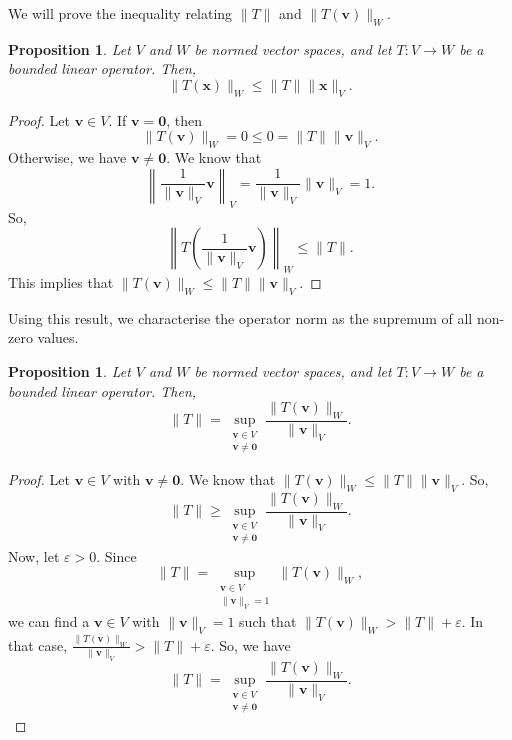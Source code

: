\documentclass[a4paper, openany]{memoir}
\theoremstyle{definition}
\theoremstyle{plain}
\newtheorem{proposition}[definition]{Proposition}
\begin{document}
    We will prove the inequality relating $\lVert T \rVert$ and $\lVert T(\bm{v}) \rVert_W$.
    \begin{proposition}
        Let $V$ and $W$ be normed vector spaces, and let $T: V \to W$ be a bounded linear operator. Then,
        \[\lVert T(\bm{x}) \rVert_W \leq \lVert T \rVert \lVert \bm{x} \rVert_V.\]
    \end{proposition}
    \begin{proof}
        Let $\bm{v} \in V$. If $\bm{v} = \bm{0}$, then
        \[\lVert T(\bm{v}) \rVert_W = 0 \leq 0 = \lVert T \rVert \lVert \bm{v} \rVert_V.\]
        Otherwise, we have $\bm{v} \neq \bm{0}$. We know that
        \[\left\lVert \frac{1}{\lVert \bm{v} \rVert_V} \bm{v} \right\rVert_V = \frac{1}{\lVert \bm{v} \rVert_V} \lVert \bm{v} \rVert_V = 1.\]
        So,
        \[\left\lVert T\left( \frac{1}{\lVert \bm{v} \rVert_V} \bm{v} \right) \right\rVert_W \leq \lVert T \rVert.\]
        This implies that $\lVert T(\bm{v}) \rVert_W \leq \lVert T \rVert \lVert \bm{v} \rVert_V$.
    \end{proof}
    \noindent Using this result, we characterise the operator norm as the supremum of all non-zero values.
    \begin{proposition}
        Let $V$ and $W$ be normed vector spaces, and let $T: V \to W$ be a bounded linear operator. Then,
        \[\lVert T \rVert = \sup_{\substack{\bm{v} \in V \\ \bm{v} \neq \bm{0}}} \frac{\lVert T(\bm{v}) \rVert_W}{\lVert \bm{v} \rVert_V}.\]
    \end{proposition}
    \begin{proof}
        Let $\bm{v} \in V$ with $\bm{v} \neq \bm{0}$. We know that $\lVert T(\bm{v}) \rVert_W \leq \lVert T \rVert \lVert \bm{v} \rVert_V$. So,
        \[\lVert T \rVert \geq \sup_{\substack{\bm{v} \in V \\ \bm{v} \neq \bm{0}}} \frac{\lVert T(\bm{v}) \rVert_W}{\lVert \bm{v} \rVert_V}.\]
        Now, let $\varepsilon > 0$. Since
        \[\lVert T \rVert = \sup_{\substack{\bm{v} \in V \\ \lVert\bm{v}\rVert_V = 1}} \lVert T(\bm{v}) \rVert_W,\]
        we can find a $\bm{v} \in V$ with $\lVert \bm{v} \rVert_V = 1$ such that $\lVert T(\bm{v}) \rVert_W  > \lVert T \rVert + \varepsilon$. In that case, $\frac{\lVert T(\bm{v}) \rVert_W}{\lVert \bm{v} \rVert_V} > \lVert T \rVert + \varepsilon$. So, we have
        \[\lVert T \rVert = \sup_{\substack{\bm{v} \in V \\ \bm{v} \neq \bm{0}}} \frac{\lVert T(\bm{v}) \rVert_W}{\lVert \bm{v} \rVert_V}.\]
    \end{proof}
\end{document}
